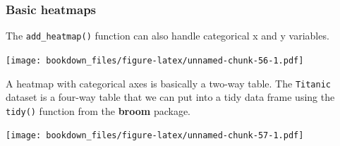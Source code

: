 \documentclass[12pt,]{isuthesis}
\newenvironment{Shaded}{\begin{snugshade}}{\end{snugshade}}
\newcommand{\KeywordTok}[1]{\textcolor[rgb]{0.13,0.29,0.53}{\textbf{{#1}}}}
\newcommand{\DataTypeTok}[1]{\textcolor[rgb]{0.13,0.29,0.53}{{#1}}}
\newcommand{\DecValTok}[1]{\textcolor[rgb]{0.00,0.00,0.81}{{#1}}}
\newcommand{\StringTok}[1]{\textcolor[rgb]{0.31,0.60,0.02}{{#1}}}
\newcommand{\NormalTok}[1]{{#1}}
\begin{document}
\subsubsection{Basic heatmaps}\label{basic-heatmaps}

The \texttt{add\_heatmap()} function can also handle categorical x and y
variables.

\begin{Shaded}
\end{Shaded}

\texttt{[image: bookdown\_files/figure-latex/unnamed-chunk-56-1.pdf]}

A heatmap with categorical axes is basically a two-way table. The
\texttt{Titanic} dataset is a four-way table that we can put into a tidy
data frame using the \texttt{tidy()} function from the \textbf{broom}
package.

\begin{Shaded}
\end{Shaded}

\texttt{[image: bookdown\_files/figure-latex/unnamed-chunk-57-1.pdf]}
\end{document}
